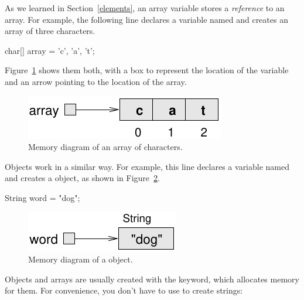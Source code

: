 
As we learned in Section~\ref{elements}, an array variable stores a {\em reference} to an array.
For example, the following line declares a variable named  and creates an array of three characters.

\begin{code}
    char[] array = {'c', 'a', 't'};
\end{code}

Figure~\ref{fig.mem2} shows them both, with a box to represent the location of the variable and an arrow pointing to the location of the array.

\begin{figure}[!ht]
\begin{center}
\includegraphics{figs/mem2.pdf}
\caption{Memory diagram of an array of characters.}
\label{fig.mem2}
\end{center}
\end{figure}

Objects work in a similar way.
For example, this line declares a  variable named  and creates a  object, as shown in Figure~\ref{fig.mem3}.

\begin{code}
String word = "dog";
\end{code}

\begin{figure}[!ht]
\begin{center}
\includegraphics{figs/mem3.pdf}
\caption{Memory diagram of a  object.}
\label{fig.mem3}
\end{center}
\end{figure}

Objects and arrays are usually created with the  keyword, which allocates memory for them. %
For convenience, you don't have to use  to create strings:


